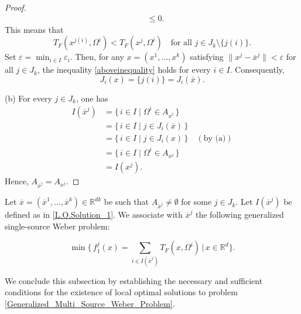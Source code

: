 \documentclass[sn-mathphys-num]{sn-jnl}%
\theoremstyle{definition}
\begin{document}
\begin{proof}
\[\begin{aligned}
		&\leq 0.
	\end{aligned}
	\]
	This means that
	\begin{equation}\label{aboveinequality}
		T_F(x^{j(i)},\Omega^i) < T_F(x^j,\Omega^i) \quad \text{for all } j \in J_k\setminus \{j(i)\}.    
	\end{equation}
	Set $\varepsilon = \min_{i\in I} \varepsilon_i$. Then, for any $x=(x^1,\dots,x^k)$ satisfying $\|x^j-\overline{x}^j\|<\varepsilon$ for all $j \in J_k$, the inequality \eqref{aboveinequality} holds for every $i\in I$. Consequently, $$J_i(x) = \{j(i)\} = J_i(\overline{x}).$$
	
	(b) For every  $j \in J_k$, one has
	\[
	\begin{aligned}
		I(\overline{x}^j)
		&= \{\,i \in I \mid \Omega^i \in A_{\overline{x}^j}\,\}\\
		&= \{\,i \in I \mid j \in J_i(\overline{x})\,\}\\
		&= \{\,i \in I \mid j \in J_i(x)\, \} \quad(\text{by (a)})\\
		&= \{\,i \in I \mid \Omega^i \in A_{x^j}\,\}\\ 
		&= I(x^j).
	\end{aligned}
	\]
	Hence, $A_{\overline{x}^j} = A_{x^j}$.
\end{proof}










Let $\overline{x}=(\overline{x}^1,\dots,\overline{x}^k)\in \mathbb{R}^{dk}$ be such that 
$A_{\overline{x}^j}\neq \emptyset$ for some $j\in J_k$. 
Let $I(\overline{x}^j)$ be defined as in \eqref{L.O.Solution_1}. We associate with $\overline{x}^j$ the following generalized single-source Weber problem:

\begin{equation}\label{single_source_Weber_problem}
	\min \biggl\{\,f^j_{1}(x)=\sum_{i \in I(\overline{x}^j)} T_F(x,\Omega^i)\,\bigg|\, x\in \mathbb{R}^d \biggr\}.
\end{equation}

We conclude this subsection by establishing the necessary and sufficient conditions for the existence of local optimal
solutions to problem \eqref{Generalized_Multi_Source_Weber_Problem}.
\end{document}
